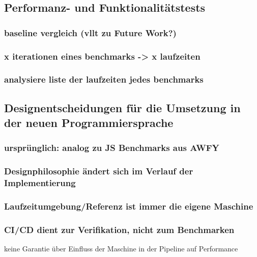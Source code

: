 \subsection{ Performanz- und Funktionalitätstests }
\subsubsection{ baseline vergleich (vllt zu Future Work?) }
\subsubsection{ x iterationen eines benchmarks -> x laufzeiten  }
\subsubsection{ analysiere liste der laufzeiten jedes benchmarks }
    
\subsection{ Designentscheidungen für die Umsetzung in der neuen Programmiersprache }
\subsubsection{ ursprünglich: analog zu JS Benchmarks aus AWFY }
\subsubsection{ Designphilosophie ändert sich im Verlauf der Implementierung  }
\subsubsection{ Laufzeitumgebung/Referenz ist immer die eigene Maschine }
\subsubsection{CI/CD dient zur Verifikation, nicht zum Benchmarken  }
    {\rightarrow} keine Garantie über Einfluss der Maschine in der Pipeline auf Performance 
    